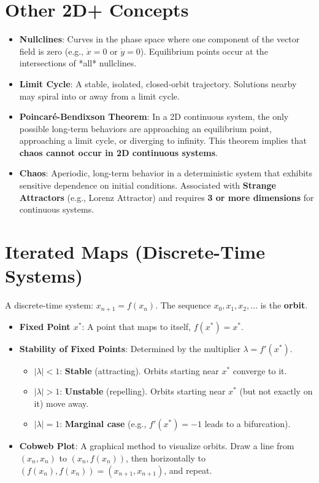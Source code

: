 \documentclass[8pt,a4paper,twocolumn]{article}
\newcommand{\0}{\mathbf{0}}
\begin{document}
\section*{Other 2D+ Concepts}
\begin{itemize}
    \item \textbf{Nullclines}: Curves in the phase space where one component of the vector field is zero (e.g., $\dot{x}=0$ or $\dot{y}=0$). Equilibrium points occur at the intersections of *all* nullclines.
    \item \textbf{Limit Cycle}: A stable, isolated, closed-orbit trajectory. Solutions nearby may spiral into or away from a limit cycle.
    \item \textbf{Poincar\'e-Bendixson Theorem}: In a 2D continuous system, the only possible long-term behaviors are approaching an equilibrium point, approaching a limit cycle, or diverging to infinity. This theorem implies that \textbf{chaos cannot occur in 2D continuous systems}.
    \item \textbf{Chaos}: Aperiodic, long-term behavior in a deterministic system that exhibits sensitive dependence on initial conditions. Associated with \textbf{Strange Attractors} (e.g., Lorenz Attractor) and requires \textbf{3 or more dimensions} for continuous systems.
\end{itemize}


\section*{Iterated Maps (Discrete-Time Systems)}
A discrete-time system: $x_{n+1} = f(x_n)$. The sequence $x_0, x_1, x_2, \dots$ is the \textbf{orbit}.
\begin{itemize}
    \item \textbf{Fixed Point $x^*$}: A point that maps to itself, $f(x^*) = x^*$.
    \item \textbf{Stability of Fixed Points}: Determined by the multiplier $\lambda = f'(x^*)$.
    \begin{itemize}
        \item $|\lambda| < 1$: \textbf{Stable} (attracting). Orbits starting near $x^*$ converge to it.
        \item $|\lambda| > 1$: \textbf{Unstable} (repelling). Orbits starting near $x^*$ (but not exactly on it) move away.
        \item $|\lambda| = 1$: \textbf{Marginal case} (e.g., $f'(x^*) = -1$ leads to a bifurcation).
    \end{itemize}
    \item \textbf{Cobweb Plot}: A graphical method to visualize orbits. Draw a line from $(x_n, x_n)$ to $(x_n, f(x_n))$, then horizontally to $(f(x_n), f(x_n)) = (x_{n+1}, x_{n+1})$, and repeat.
\end{itemize}
\end{document}
